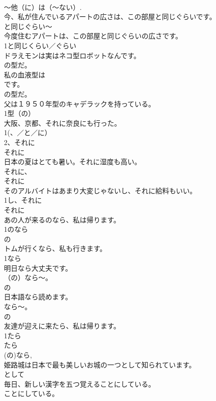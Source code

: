 \documentclass[8pt]{extreport}
\begin{document}
\begin{CJK}{UTF8}{min}
{\\	〜他（に）は（〜ない）. 
\\	今、私が住んでいるアパートの広さは、この部屋と同じぐらいです。	
\\	と同じぐらい〜 
\\	今度住むアパートは、この部屋と同じぐらいの広さです。	
\\	1と同じくらい／ぐらい
\\	ドラえモンは実はネコ型ロボットなんです。	
\\	の型だ。 
\\	私の血液型は
\\	です。	
\\	の型だ。 
\\	父は１９５０年型のキャデラックを持っている。	
\\	1型（の）
\\	大阪、京都、それに奈良にも行った。	
\\	1(、／と／に）
\\	2、それに
\\	それに 
\\	日本の夏はとても暑い。それに湿度も高い。	
\\	それに、
\\	それに 
\\	そのアルバイトはあまり大変じゃないし、それに給料もいい。	
\\	1し、それに　
\\	それに 
\\	あの人が来るのなら、私は帰ります。	
\\	1のなら
\\	の 
\\	トムが行くなら、私も行きます。	
\\	1なら
\\	明日なら大丈夫です。	
\\	（の）なら〜。 
\\	の 
\\	日本語なら読めます。	
\\	なら〜。 
\\	の 
\\	友達が迎えに来たら、私は帰ります。	
\\	1たら
\\	たら 
\\	(の)なら, 
\\	姫路城は日本で最も美しいお城の一つとして知られています。	
\\	として 
\\	毎日、新しい漢字を五つ覚えることにしている。	
\\	ことにしている。 
}
\end{CJK}
\end{document}
